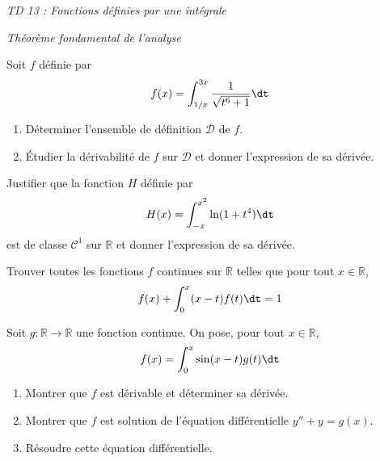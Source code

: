 \documentclass[a4paper,10pt]{report}
\begin{document}
\everymath{\displaystyle}

\begin{center}
\textit{{ {\huge TD 13 : Fonctions définies par une intégrale}}}
\end{center}


\bigskip

\begin{center}
\textit{{ {\large Théorème fondamental de l'analyse}}}
\end{center}

\medskip

\begin{Exercice}{} Soit $f$ définie par 
$$f(x) = \int_{1/x}^{3x}\frac{1}{\sqrt{t^6+1}}\dt$$ 
\begin{enumerate}
\item Déterminer l'ensemble de définition $\mathcal{D}$ de $f$.
\item Étudier la dérivabilité de $f$ sur $\mathcal{D}$ et donner l'expression de sa dérivée.
\end{enumerate}
\end{Exercice} 



\begin{Exercice}{} Justifier que la fonction $H$ définie par 
$$H(x) = \int_{-x}^{x^2} \ln(1+t^4) \dt$$
est de classe $\mathcal{C}^1$ sur $\mathbb{R}$ et donner l'expression de sa dérivée.
\end{Exercice}


\begin{Exercice}{} Trouver toutes les fonctions $f$ continues sur $\mathbb{R}$ telles que pour tout $x \in \mathbb{R}$,
$$ f(x) + \int_{0}^x (x-t)f(t) \dt =1$$
\end{Exercice} 


\begin{Exercice}{} Soit $g : \mathbb{R} \rightarrow \mathbb{R}$ une fonction continue. On pose, pour tout $x \in \mathbb{R}$,
    \[
    f(x) = \int_0^x {\sin(x - t)g(t) \dt}
    \]
    \begin{enumerate}
      \item Montrer que $f$ est dérivable et déterminer sa dérivée.
      \item Montrer que $f$ est solution de l'équation différentielle $y'' + y = g(x)$.
      \item Résoudre cette équation différentielle.
    \end{enumerate}
\end{Exercice}
\end{document}
